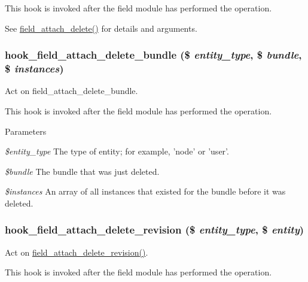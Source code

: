 This hook is invoked after the field module has performed the operation.

See \hyperlink{group__field__attach_gac2e3658c9c02d0d0e71359f9ef2f207a}{field\_\-attach\_\-delete()} for details and arguments. \hypertarget{group__field__attach_gac2aac33854dd18a2037a13b133c26481}{
\subsubsection[{hook\_\-field\_\-attach\_\-delete\_\-bundle}]{\setlength{\rightskip}{0pt plus 5cm}hook\_\-field\_\-attach\_\-delete\_\-bundle (\$ {\em entity\_\-type}, \/  \$ {\em bundle}, \/  \$ {\em instances})}}
\label{group__field__attach_gac2aac33854dd18a2037a13b133c26481}
Act on field\_\-attach\_\-delete\_\-bundle.

This hook is invoked after the field module has performed the operation.


\begin{DoxyParams}{Parameters}
\item[{\em \$entity\_\-type}]The type of entity; for example, 'node' or 'user'. \item[{\em \$bundle}]The bundle that was just deleted. \item[{\em \$instances}]An array of all instances that existed for the bundle before it was deleted. \end{DoxyParams}
\hypertarget{group__field__attach_ga99f52991e1d235aa3c57d21778b4b595}{
\subsubsection[{hook\_\-field\_\-attach\_\-delete\_\-revision}]{\setlength{\rightskip}{0pt plus 5cm}hook\_\-field\_\-attach\_\-delete\_\-revision (\$ {\em entity\_\-type}, \/  \$ {\em entity})}}
\label{group__field__attach_ga99f52991e1d235aa3c57d21778b4b595}
Act on \hyperlink{group__field__attach_gaa9eae65e6d9f1996cb27a55ba25b56e9}{field\_\-attach\_\-delete\_\-revision()}.

This hook is invoked after the field module has performed the operation.

